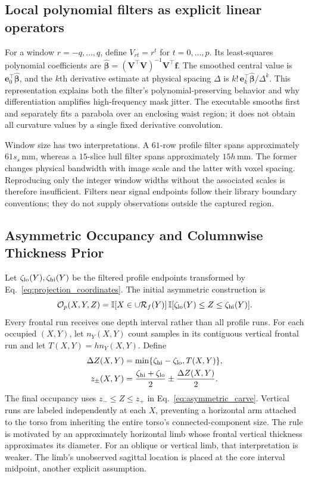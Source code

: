 \documentclass[11pt,a4paper]{article}
\numberwithin{equation}{section}
\begin{document}
\subsection{Local polynomial filters as explicit linear operators}
For a window $r=-q,\ldots,q$, define $V_{rt}=r^t$ for $t=0,\ldots,p$. Its least-squares polynomial coefficients are $\hat{\boldsymbol\beta}=(\mathbf V^\top\mathbf V)^{-1}\mathbf V^\top\mathbf f$. The smoothed central value is $\mathbf e_0^\top\hat{\boldsymbol\beta}$, and the $k$th derivative estimate at physical spacing $\Delta$ is $k!\,\mathbf e_k^\top\hat{\boldsymbol\beta}/\Delta^k$. This representation explains both the filter's polynomial-preserving behavior and why differentiation amplifies high-frequency mask jitter. The executable smooths first and separately fits a parabola over an enclosing waist region; it does not obtain all curvature values by a single fixed derivative convolution.

Window size has two interpretations. A $61$-row profile filter spans approximately $61s_s$\,mm, whereas a $15$-slice hull filter spans approximately $15h$\,mm. The former changes physical bandwidth with image scale and the latter with voxel spacing. Reproducing only the integer window widths without the associated scales is therefore insufficient. Filters near signal endpoints follow their library boundary conventions; they do not supply observations outside the captured region.

\subsection{Asymmetric Occupancy and Columnwise Thickness Prior}
Let $\zeta_{\rm lo}(Y),\zeta_{\rm hi}(Y)$ be the filtered profile endpoints transformed by Eq.~\eqref{eq:projection_coordinates}. The initial asymmetric construction is
\begin{equation}
\mathcal O_p(X,Y,Z)=\mathbb I[X\in\cup\mathcal R_f(Y)]\,
\mathbb I[\zeta_{\rm lo}(Y)\le Z\le\zeta_{\rm hi}(Y)].
\label{eq:asymmetric_carve}
\end{equation}
Every frontal run receives one depth interval rather than all profile runs. For each occupied $(X,Y)$, let $n_Y(X,Y)$ count samples in its contiguous vertical frontal run and let $T(X,Y)=hn_Y(X,Y)$. Define
\begin{align}
\Delta Z(X,Y)&=\min\{\zeta_{\rm hi}-\zeta_{\rm lo},T(X,Y)\},\label{eq:depth_narrowing}\\
z_\pm(X,Y)&=\frac{\zeta_{\rm hi}+\zeta_{\rm lo}}{2}\pm\frac{\Delta Z(X,Y)}2.\nonumber
\end{align}
The final occupancy uses $z_-\le Z\le z_+$ in Eq.~\eqref{eq:asymmetric_carve}. Vertical runs are labeled independently at each $X$, preventing a horizontal arm attached to the torso from inheriting the entire torso's connected-component size. The rule is motivated by an approximately horizontal limb whose frontal vertical thickness approximates its diameter. For an oblique or vertical limb, that interpretation is weaker. The limb's unobserved sagittal location is placed at the core interval midpoint, another explicit assumption.
\end{document}
